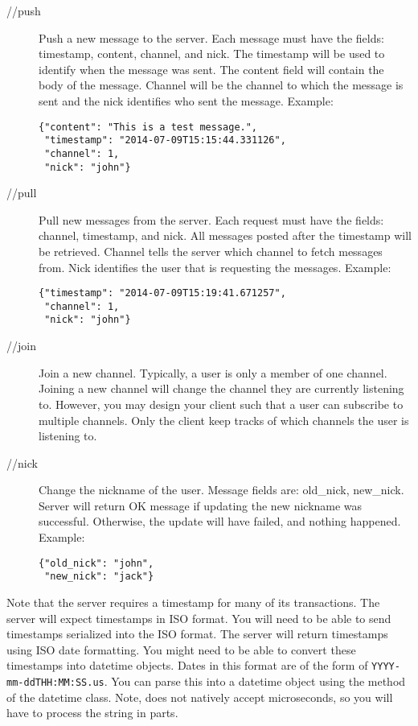 \begin{problem}
\begin{description}
\item[//push] Push a new message to the server.
Each message must have the fields: timestamp, content, channel, and nick.
The timestamp will be used to identify when the message was sent.
The content field will contain the body of the message.
Channel will be the channel to which the message is sent and the nick identifies who sent the message.
Example:
\begin{verbatim}
{"content": "This is a test message.",
 "timestamp": "2014-07-09T15:15:44.331126",
 "channel": 1,
 "nick": "john"}
\end{verbatim}
\item[//pull] Pull new messages from the server.
Each request must have the fields: channel, timestamp, and nick.
All messages posted after the timestamp will be retrieved.
Channel tells the server which channel to fetch messages from.
Nick identifies the user that is requesting the messages.
Example:
\begin{verbatim}
{"timestamp": "2014-07-09T15:19:41.671257",
 "channel": 1,
 "nick": "john"}
\end{verbatim}
\item[//join] Join a new channel.  Typically, a user is only a member of one channel.  Joining a new channel will change the channel they are currently listening to.  However, you may design your client such that a user can subscribe to multiple channels.
Only the client keep tracks of which channels the user is listening to.
\item[//nick] Change the nickname of the user.
Message fields are: old\_nick, new\_nick.
Server will return OK message if updating the new nickname was successful.
Otherwise, the update will have failed, and nothing happened.
Example:
\begin{verbatim}
{"old_nick": "john",
 "new_nick": "jack"}
\end{verbatim}
\end{description}

Note that the server requires a timestamp for many of its transactions.
The server will expect timestamps in ISO format.  You will need to be able to send  timestamps serialized into the ISO format.  The server will return timestamps using ISO date formatting.  You might need to be able to convert these timestamps into datetime objects.
Dates in this format are of the form of \texttt{YYYY-mm-ddTHH:MM:SS.us}.
You can parse this into a datetime object using the  method of the datetime class.  Note,  does not natively accept microseconds, so you will have to process the string in parts.
\label{prob:messageboard}
\end{problem}
